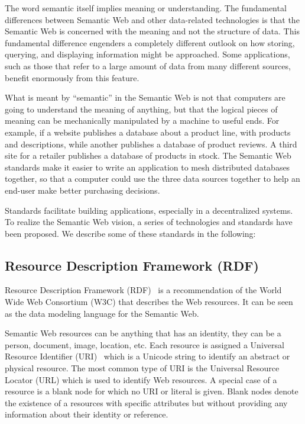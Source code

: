 The word semantic itself implies meaning or understanding. The fundamental differences between Semantic Web and other data-related technologies is that the Semantic Web is concerned with the meaning and not the structure of data. This fundamental difference engenders a completely different outlook on how storing, querying, and displaying information might be approached.  Some applications, such as those that refer to a large amount of data from many different sources, benefit enormously from this feature.

What is meant by ``semantic'' in the Semantic Web is not that computers are going to understand the meaning of anything, but that the logical pieces of meaning can be mechanically manipulated by a machine to useful ends. For example, if a website publishes a database about a product line, with products and descriptions, while another publishes a database of product reviews. A third site for a retailer publishes a database of products in stock. The Semantic Web standards make it easier to write an application to mesh distributed databases together, so that a computer could use the three data sources together to help an end-user make better purchasing decisions.

Standards facilitate building applications, especially in a decentralized systems. To realize the Semantic Web vision, a series of technologies and standards have been proposed. We describe some of these standards in the following:

\subsection{Resource Description Framework (RDF)}
Resource Description Framework (RDF)~\cite{Lassila:RDF:99} is a recommendation of the World Wide Web Consortium (W3C) that describes the Web resources. It can be seen as the data modeling language for the Semantic Web.

Semantic Web resources can be anything that has an identity, they can be a person, document, image, location, etc. Each resource is assigned a Universal Resource Identifier (URI)~\cite{Berners:RFC:2005} which is a Unicode string to identify an abstract or physical resource. The most common type of URI is the Universal Resource Locator (URL) which is used to identify Web resources. A special case of a resource is a blank node for which no URI or literal is given. Blank nodes denote the existence of a resources with specific attributes but without providing any information about their identity or reference.

